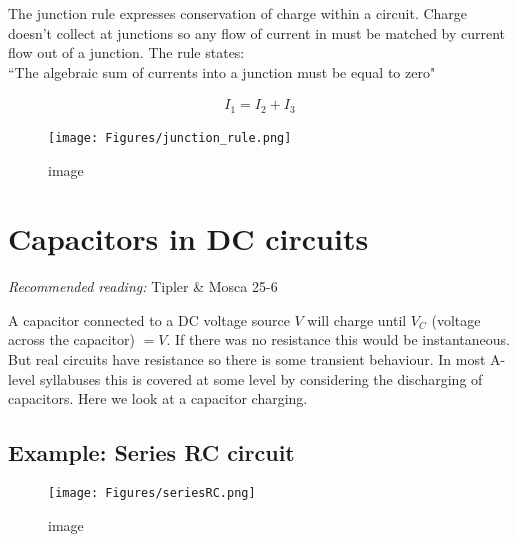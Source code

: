 \documentclass[
]{book}
\theoremstyle{definition}
\theoremstyle{definition}
\theoremstyle{definition}
\theoremstyle{definition}
\theoremstyle{remark}
\begin{document}
The junction rule expresses conservation of charge within a circuit.
Charge doesn't collect at junctions so any flow of current in must be
matched by current flow out of a junction. The rule states:\\

``The algebraic sum of currents into a junction must be equal to zero"

\[\begin{aligned}
I_1 = I_2 + I_3
\end{aligned}\]

\begin{figure}
\centering
\texttt{[image: Figures/junction\_rule.png]}
\caption{image}
\end{figure}

\hypertarget{capacitors-in-dc-circuits}{%
\section{Capacitors in DC circuits}\label{capacitors-in-dc-circuits}}

\emph{Recommended reading:} Tipler \& Mosca 25-6

A capacitor connected to a DC voltage source \(V\) will charge until
\(V _C\) (voltage across the capacitor) \(= V\). If there was no resistance
this would be instantaneous. But real circuits have resistance so there
is some transient behaviour. In most A-level syllabuses this is covered
at some level by considering the discharging of capacitors. Here we look
at a capacitor charging.

\hypertarget{example-series-rc-circuit}{%
\subsection*{Example: Series RC circuit}\label{example-series-rc-circuit}}

\begin{figure}
\centering
\texttt{[image: Figures/seriesRC.png]}
\caption{image}
\end{figure}
\end{document}
